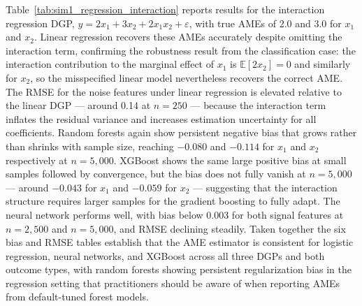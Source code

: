 \documentclass[12pt]{article}
\begin{document}
	Table~\ref{tab:sim1_regression_interaction} reports results for the interaction regression DGP, $y = 2x_1 + 3x_2 + 2x_1 x_2 + \varepsilon$, with true AMEs of 2.0 and 3.0 for $x_1$ and $x_2$. Linear regression recovers these AMEs accurately despite omitting the interaction term, confirming the robustness result from the classification case: the interaction contribution to the marginal effect of $x_1$ is $\mathbb{E}[2x_2] = 0$ and similarly for $x_2$, so the misspecified linear model nevertheless recovers the correct AME. The RMSE for the noise features under linear regression is elevated relative to the linear DGP --- around 0.14 at $n=250$ --- because the interaction term inflates the residual variance and increases estimation uncertainty for all coefficients. Random forests again show persistent negative bias that grows rather than shrinks with sample size, reaching $-0.080$ and $-0.114$ for $x_1$ and $x_2$ respectively at $n=5{,}000$. XGBoost shows the same large positive bias at small samples followed by convergence, but the bias does not fully vanish at $n=5{,}000$ --- around $-0.043$ for $x_1$ and $-0.059$ for $x_2$ --- suggesting that the interaction structure requires larger samples for the gradient boosting to fully adapt. The neural network performs well, with bias below 0.003 for both signal features at $n=2{,}500$ and $n=5{,}000$, and RMSE declining steadily. Taken together the six bias and RMSE tables establish that the AME estimator is consistent for logistic regression, neural networks, and XGBoost across all three DGPs and both outcome types, with random forests showing persistent regularization bias in the regression setting that practitioners should be aware of when reporting AMEs from default-tuned forest models.
	
\end{document}
